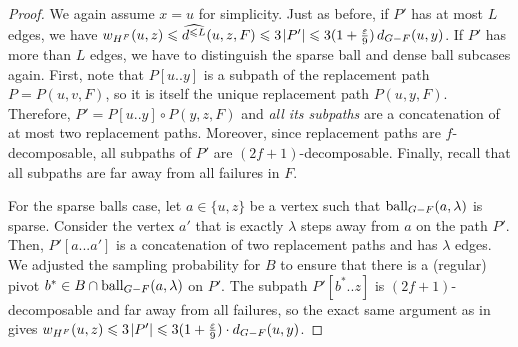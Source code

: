 \documentclass{theoretics}
\newcommand*{\length}[1]{|#1|}
\newcommand*{\ball}{\mbox{\rm ball}}
\newcommand*{\nwspace}{\hspace*{.1em}}
\renewcommand{\le}{\leqslant}
\newcommand{\eps}{\varepsilon}
\begin{document}
\begin{proof}
	We again assume $x=u$ for simplicity.
	Just as before, if $P'$ has at most $L$ edges, we have
	$w_{H^F}(u,z) \le \widehat{d^{\le L}}(u,z,F) \le 3 \nwspace \length{P'}
      \le 3(1+\frac{\eps}{9}) \, d_{G-F}(u,y)$.
%  	
  	If $P'$ has more than $L$ edges, we have to distinguish 
  	the sparse ball and dense ball subcases again.
  	First, note that $P[u..y]$ is a subpath of the replacement path $P = P(u,v,F)$,
  	so it is itself the unique replacement path $P(u,y,F)$.
  	Therefore, $P' = P[u..y] \circ P(y,z,F)$ and \emph{all its subpaths} are a concatenation of at most two replacement paths.
  	Moreover, since replacement paths are $f$-decomposable,
  	all subpaths of $P'$ are $(2f{+}1)$-decomposable.
  	Finally, recall that all subpaths are far away from all failures in $F$.

  	For the sparse balls case, let $a \in \{u,z\}$ be a vertex such that $\ball_{G-F}(a,\lambda)$ is sparse.
  	Consider the vertex $a'$ that is exactly $\lambda$ steps away from $a$ on the path $P'$.
  	Then, $P'[a...a']$ is a concatenation of two replacement paths and has $\lambda$ edges.
  	We adjusted the sampling probability for $B$ to ensure that there is a (regular) pivot
  	$b^* \in B \cap \ball_{G-F}(a,\lambda)$ on $P'$.
  	The subpath $P'[b^*..z]$ is $(2f{+}1)$-decomposable and far away from all failures,
  	so the exact same argument as in 
  	gives $w_{H^F}(u,z) \le 3 \nwspace \length{P'} \le 3(1+ \tfrac{\eps}{9}) \cdot d_{G-F}(u,y)$.
  	

\end{proof}
\end{document}
